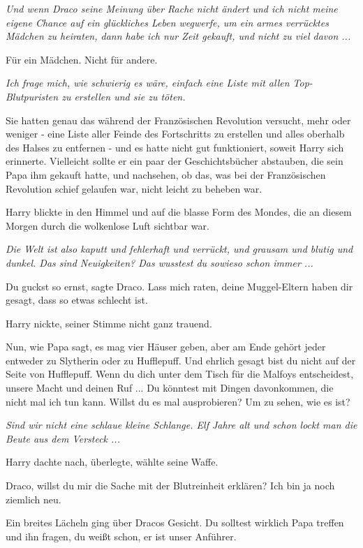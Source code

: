 \emph{Und wenn Draco seine Meinung über Rache nicht ändert und ich nicht meine
eigene Chance auf ein glückliches Leben wegwerfe, um ein armes verrücktes
Mädchen zu heiraten, dann habe ich nur Zeit gekauft, und nicht zu viel davon ...
}

Für ein Mädchen. Nicht für andere.

\emph{Ich frage mich, wie schwierig es wäre, einfach eine Liste mit allen
Top-Blutpuristen zu erstellen und sie zu töten.}

Sie hatten genau das während der Französischen Revolution versucht, mehr oder
weniger - eine Liste aller Feinde des Fortschritts zu erstellen und alles
oberhalb des Halses zu entfernen - und es hatte nicht gut funktioniert, soweit
Harry sich erinnerte. Vielleicht sollte er ein paar der Geschichtsbücher
abstauben, die sein Papa ihm gekauft hatte, und nachsehen, ob das, was bei der
Französischen Revolution schief gelaufen war, nicht leicht zu beheben war.

Harry blickte in den Himmel und auf die blasse Form des Mondes, die an diesem
Morgen durch die wolkenlose Luft sichtbar war.

\emph{Die Welt ist also kaputt und fehlerhaft und verrückt, und grausam und
blutig und dunkel. Das sind Neuigkeiten? Das wusstest du sowieso schon immer ...}

\glqq{}Du guckst so ernst\grqq{}, sagte Draco. \glqq{}Lass mich raten, deine
Muggel-Eltern haben dir gesagt, dass so etwas schlecht ist.\grqq{}

Harry nickte, seiner Stimme nicht ganz trauend.

\glqq{}Nun, wie Papa sagt, es mag vier Häuser geben, aber am Ende gehört jeder
entweder zu Slytherin oder zu Hufflepuff. Und ehrlich gesagt bist du nicht auf
der Seite von Hufflepuff. Wenn du dich unter dem Tisch für die Malfoys
entscheidest, unsere Macht und deinen Ruf ... Du könntest mit Dingen davonkommen,
die nicht mal ich tun kann. Willst du es mal ausprobieren? Um zu sehen, wie es
ist?\grqq{}

\emph{Sind wir nicht eine schlaue kleine Schlange. Elf Jahre alt und schon lockt
man die Beute aus dem Versteck ...}

Harry dachte nach, überlegte, wählte seine Waffe.

\glqq{}Draco, willst du mir die Sache mit der Blutreinheit erklären? Ich bin ja
noch ziemlich neu.\grqq{}

Ein breites Lächeln ging über Dracos Gesicht. \glqq{}Du solltest wirklich Papa
treffen und ihn fragen, du weißt schon, er ist unser Anführer.\grqq{}

